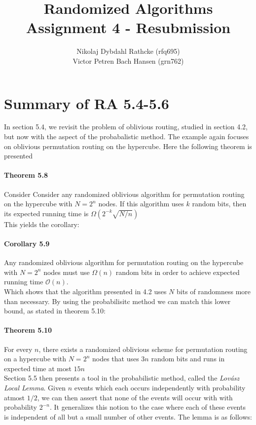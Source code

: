 \documentclass[a4paper, fleqn]{article}
\author{Nikolaj Dybdahl Rathcke (rfq695) \\ Victor Petren Bach Hansen (grn762)}
\title{Randomized Algorithms \\ Assignment 4 - Resubmission}
\begin{document}
\maketitle

\section*{Summary of RA 5.4-5.6}
In section 5.4, we revisit the problem of oblivious routing, studied in section 4.2, but now with the aspect of the probabalistic method. The example again focuses on oblivious permutation routing on the hypercube. Here the following theorem is presented
\paragraph{Theorem 5.8} Consider Consider any randomized oblivious algorithm for permutation routing on the hypercube with $N=2^n$ nodes. If this algorithm uses $k$  random bits, then its expected running time is $\Omega(2^{-k} \sqrt{N/n})$\\

This yields the corollary:
\paragraph{Corollary 5.9} Any randomized oblivious algorithm for permutation routing on the hypercube with $N=2^n$ nodes must use $\Omega(n)$ random bits in order to achieve expected running time $\mathcal{O}(n)$.\\

Which shows that the algorithm presented in 4.2 uses $N$ bits of randomness more than necessary. By using the probabilisitc method we can match this lower bound, as stated in theorem 5.10:
\paragraph{Theorem 5.10} For every $n$, there exists a randomized oblivious scheme for permutation routing on a hypercube with $N = 2^n$ nodes that uses $3n$ random bits and runs in expected time at most $15n$\\

Section 5.5 then presents a tool in the probabilistic method, called the \textit{Lovász Local Lemma}. Given $n$ events which each occurs independently with probability atmost $1/2$, we can then assert that none of the events will occur with with probability $2^{-n}$. It generalizes this notion to the case where each of these events is independent of all but a small number of other events. The lemma is as follows:
\end{document}
